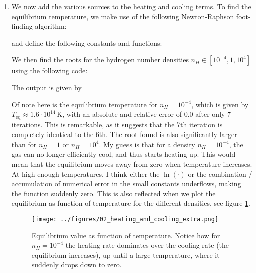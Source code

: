 \begin{enumerate}[label=(\alph*)]
\item {
We now add the various sources to the heating and cooling terms. To find the equilibrium temperature, we make use of the following Newton-Raphson foot-finding algorithm:

and define the following constants and functions:


We then find the roots for the hydrogen number densities $n_H\in[10^{-4}, 1, 10^4]$ using the following code:

The output is given by

Of note here is the equilibrium temperature for $n_H = 10^{-4}$, which is given by $T_\text{eq}\approx 1.6\cdot 10^{14}\,\text{K}$, with an absolute and relative error of $0.0$ after only 7 iterations. This is remarkable, as it suggests that the 7th iteration is completely identical to the 6th. The root found is also significantly larger than for $n_H=1$ or $n_H=10^4$. My guess is that for a density $n_H=10^{-4}$, the gas can no longer efficiently cool, and thus starts heating up. This would mean that the equilibrium moves away from zero when temperature increases. At high enough temperatures, I think either the $\ln(\cdot)$ or the combination / accumulation of numerical error in the small constants underflows, making the function suddenly zero. This is also reflected when we plot the equilibrium as function of temperature for the different densities, see figure \ref{fig:diff_dens}.

\begin{figure}[H]
    \centering
    \texttt{[image: ../figures/02\_heating\_and\_cooling\_extra.png]}
    \caption{Equilibrium value as function of temperature. Notice how for $n_H=10^{-4}$ the heating rate dominates over the cooling rate (the equilibrium increases), up until a large temperature, where it suddenly drops down to zero.}
    \label{fig:diff_dens}
\end{figure}

}

\end{enumerate}